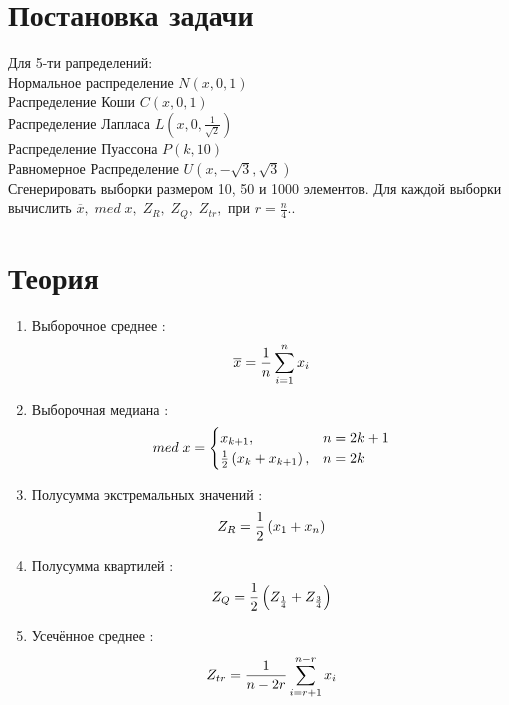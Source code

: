 \documentclass[a4]{article}
\begin{document}
	
	\newpage
	\tableofcontents{}
	\newpage
	\listoftables
	\newpage
	
	
	\section{Постановка задачи}
	
	Для 5-ти рапределений:\\
		Нормальное распределение $N(x,0,1)$\\
		Распределение Коши $C(x,0,1)$\\
		Распределение Лапласа $L( x,0,\frac{1}{\sqrt{2}})$\\
		Распределение Пуассона $P(k, 10)$\\
		Равномерное Распределение $U(x,-\sqrt{3}, \sqrt{3})$\\
		
		Сгенерировать выборки размером 10, 50 и 1000 элементов.
		Для каждой выборки вычислить $\overline{x},\; med\; x,\; Z_R,\; Z_Q,\; Z_{tr},$ при $r = \frac{n}{4}.$.
		
	
	\section{Теория}
		\begin{enumerate}
			\item Выборочное среднее \cite{average}:
			\begin{equation}\label{eqn:average}
			\overline{x} = \frac{1}{n}\sum_{i=1}^n x_i \hfill  
			\end{equation}
			\item Выборочная медиана \cite{med}:
			\begin{equation}
			med\; x = \begin{cases}
			x_{k+1}, & n = 2k+1\\
			\frac{1}{2}\left(x_k+x_{k+1}\right), & n = 2k
			\end{cases} \hfill  \label{eqn:med}
			\end{equation}
			\item Полусумма экстремальных значений \cite{mean_extr}:
			\begin{equation}
			Z_R = \frac{1}{2}\left(x_1+x_n\right) \hfill  \label{eqn:mean_extr}
			\end{equation}
			\item Полусумма квартилей \cite{quartiles}:
			\begin{equation}
			Z_Q = \frac{1}{2}\left(Z_{\frac{1}{4}}+Z_{\frac{3}{4}}\right) \hfill  \label{eqn:quartiles}
			\end{equation}
			\item Усечённое среднее \cite{cut_mean}:
			\begin{equation}
			Z_{tr} = \frac{1}{n - 2r}\sum_{i=r+1}^{n-r} x_i \hfill  \label{eqn:cut_mean}
			\end{equation}
		\end{enumerate}	
		
\end{document}
